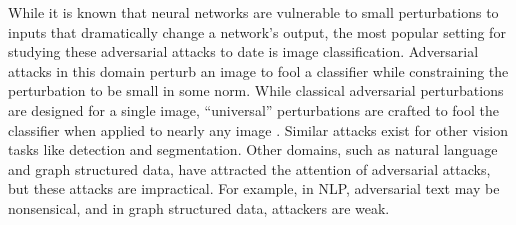 While it is known that neural networks are vulnerable to small perturbations to inputs that dramatically change a network's output, the most popular setting for studying these adversarial attacks to date is image classification. Adversarial attacks in this domain perturb an image to fool a classifier while constraining the perturbation to be small in some norm. While classical adversarial perturbations are designed for a single image, “universal” perturbations are crafted to fool the classifier when applied to nearly any image . Similar attacks exist for other vision tasks like detection and segmentation. Other domains, such as natural language and graph structured data, have attracted the attention of adversarial attacks, but these attacks are impractical. For example, in NLP, adversarial text may be nonsensical, and in graph structured data, attackers are weak.
